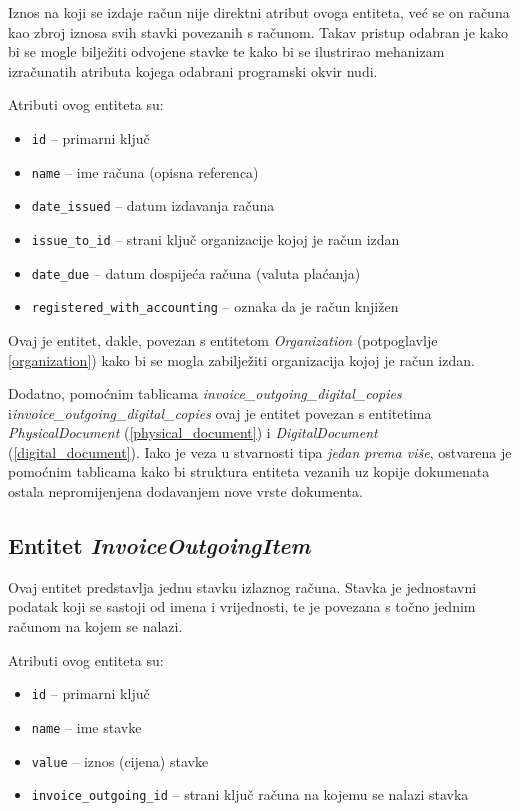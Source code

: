 \documentclass[times, utf8, diplomski]{fer}
\begin{document}
Iznos na koji se izdaje račun nije direktni atribut ovoga entiteta, već se on
računa kao zbroj iznosa svih stavki povezanih s računom. Takav pristup odabran
je kako bi se mogle bilježiti odvojene stavke te kako bi se ilustrirao mehanizam
izračunatih atributa kojega odabrani programski okvir nudi.

\medskip
Atributi ovog entiteta su:
\begin{itemize}
    \item \texttt{id} -- primarni ključ
    \item \texttt{name} -- ime računa (opisna referenca)
    \item \texttt{date\_issued} -- datum izdavanja računa
    \item \texttt{issue\_to\_id} -- strani ključ organizacije kojoj je račun
        izdan
    \item \texttt{date\_due} -- datum dospijeća računa (valuta plaćanja)
    \item \texttt{registered\_with\_accounting} -- oznaka da je račun knjižen
\end{itemize}

Ovaj je entitet, dakle, povezan s entitetom \emph{Organization} (potpoglavlje
\ref{organization}) kako bi se mogla zabilježiti organizacija kojoj je račun
izdan.

Dodatno, pomoćnim tablicama \emph{invoice\_outgoing\_digital\_copies}
i\linebreak \emph{invoice\_outgoing\_digital\_copies} ovaj je entitet povezan s
entitetima \emph{PhysicalDocument} (\ref{physical_document}) i
\emph{DigitalDocument} (\ref{digital_document}). Iako je veza u stvarnosti tipa
\emph{jedan prema više}, ostvarena je pomoćnim tablicama kako bi struktura
entiteta vezanih uz kopije dokumenata ostala nepromijenjena dodavanjem nove
vrste dokumenta.


\subsection{Entitet \emph{InvoiceOutgoingItem}} \label{invoice_outgoing_item}

Ovaj entitet predstavlja jednu stavku izlaznog računa. Stavka je jednostavni
podatak koji se sastoji od imena i vrijednosti, te je povezana s točno jednim
računom na kojem se nalazi.

\medskip
Atributi ovog entiteta su:
\begin{itemize}
    \item \texttt{id} -- primarni ključ
    \item \texttt{name} -- ime stavke
    \item \texttt{value} -- iznos (cijena) stavke
    \item \texttt{invoice\_outgoing\_id} -- strani ključ računa na kojemu se
        nalazi stavka
\end{itemize}
\end{document}
